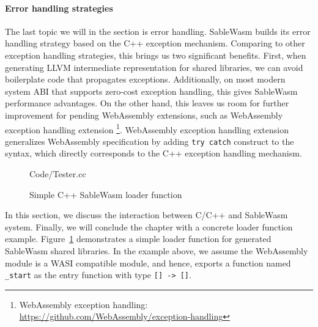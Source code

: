 \paragraph{Error handling strategies}
The last topic we will in the section is error handling. SableWasm builds its error handling strategy based on the C++ exception mechanism. Comparing to other exception handling strategies, this brings us two significant benefits. First, when generating LLVM intermediate representation for shared libraries, we can avoid boilerplate code that propagates exceptions. Additionally, on most modern system ABI that supports zero-cost exception handling, this gives SableWasm performance advantages.  On the other hand, this leaves us room for further improvement for pending WebAssembly extensions, such as WebAssembly exception handling extension \footnote{WebAssembly exception handling: \url{https://github.com/WebAssembly/exception-handling}}. WebAssembly exception handling extension generalizes WebAssembly specification by adding \texttt{try catch} construct to the syntax, which directly corresponds to the C++ exception handling mechanism.

\begin{figure}
    \centering
    
    {Code/Tester.cc}
    \caption{Simple C++ SableWasm loader function}
    \label{fig:sablewasm-loader}
\end{figure}

In this section, we discuss the interaction between C/C++ and SableWasm system. Finally, we will conclude the chapter with a concrete loader function example. Figure~\ref{fig:sablewasm-loader} demonstrates a simple loader function for generated SableWasm shared libraries. In the example above, we assume the WebAssembly module is a WASI compatible module, and hence, exports a function named \texttt{\_start} as the entry function with type \texttt{[] -> []}.